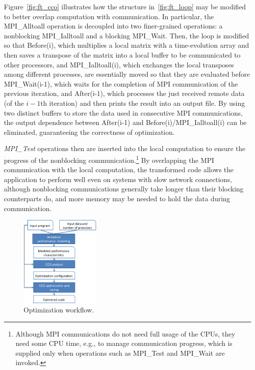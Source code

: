Figure~\ref{fig:ft_cco} illustrates how the structure
in~\ref{fig:ft_loop} may be modified to better overlap computation
with communication.  In particular, the MPI\_Alltoall operation is
decoupled into two finer-grained operations: a nonblocking
MPI\_Ialltoall and a blocking MPI\_Wait.  Then, the loop is modified
so that Before(i), which multiplies a local matrix with a
time-evolution array and then saves a transpose of the matrix into a
local buffer to be communicated to other processors, and
MPI\_Ialltoall(i), which exchanges the local transposes among different
processes, are essentially moved so that they are evaluated before
MPI\_Wait(i-1), which waits for the completion of MPI communication
of the previous iteration, and After(i-1), which processes the just
received remote data (of the $i-1$th iteration) and then prints the
result into an output file.  By using two distinct buffers to store
the data used in consecutive MPI communications, the output
dependence between After(i-1) and Before(i)/MPI\_Ialltoall(i) can be
eliminated, guaranteeing the correctness of optimization.

\emph{MPI\_Test} operations then are inserted into the local computation to
ensure the progress of the nonblocking
communication.\footnote{Although MPI communications do not need full
  usage of the CPUs, they need some CPU time, e.g., to manage communication
  progress, which is supplied only when operations such as MPI\_Test
  and MPI\_Wait are invoked.}  By overlapping the MPI communication
with the local computation, the transformed code allows the
application to perform well even on systems with slow network
connections, although nonblocking communications generally take longer
than their blocking counterparts do, and more memory may be needed to
hold the data during communication.

\begin{figure}[h]
\centering
\includegraphics[width=0.35\textwidth]{fig/framework.png} %
\caption{Optimization workflow.}
\label{fig:overview}
\end{figure}

